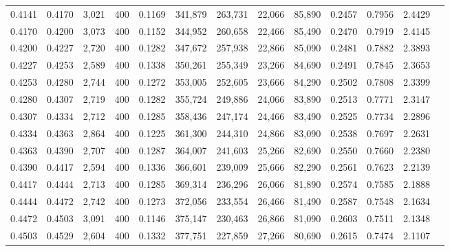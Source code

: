 \begin{tabular}{rrrrrrrrrrrrr}
0.4141 & 0.4170 &  3,021 & 400 &                                     0.1169 & 341,879 & 263,731 &  22,066 &  85,890 & 0.2457 & 0.7956 & 2.4429 \\
0.4170 & 0.4200 &  3,073 & 400 &                                     0.1152 & 344,952 & 260,658 &  22,466 &  85,490 & 0.2470 & 0.7919 & 2.4145 \\
0.4200 & 0.4227 &  2,720 & 400 &                                     0.1282 & 347,672 & 257,938 &  22,866 &  85,090 & 0.2481 & 0.7882 & 2.3893 \\
0.4227 & 0.4253 &  2,589 & 400 &                                     0.1338 & 350,261 & 255,349 &  23,266 &  84,690 & 0.2491 & 0.7845 & 2.3653 \\
0.4253 & 0.4280 &  2,744 & 400 &                                     0.1272 & 353,005 & 252,605 &  23,666 &  84,290 & 0.2502 & 0.7808 & 2.3399 \\
0.4280 & 0.4307 &  2,719 & 400 &                                     0.1282 & 355,724 & 249,886 &  24,066 &  83,890 & 0.2513 & 0.7771 & 2.3147 \\
0.4307 & 0.4334 &  2,712 & 400 &                                     0.1285 & 358,436 & 247,174 &  24,466 &  83,490 & 0.2525 & 0.7734 & 2.2896 \\
0.4334 & 0.4363 &  2,864 & 400 &                                     0.1225 & 361,300 & 244,310 &  24,866 &  83,090 & 0.2538 & 0.7697 & 2.2631 \\
0.4363 & 0.4390 &  2,707 & 400 &                                     0.1287 & 364,007 & 241,603 &  25,266 &  82,690 & 0.2550 & 0.7660 & 2.2380 \\
0.4390 & 0.4417 &  2,594 & 400 &                                     0.1336 & 366,601 & 239,009 &  25,666 &  82,290 & 0.2561 & 0.7623 & 2.2139 \\
0.4417 & 0.4444 &  2,713 & 400 &                                     0.1285 & 369,314 & 236,296 &  26,066 &  81,890 & 0.2574 & 0.7585 & 2.1888 \\
0.4444 & 0.4472 &  2,742 & 400 &                                     0.1273 & 372,056 & 233,554 &  26,466 &  81,490 & 0.2587 & 0.7548 & 2.1634 \\
0.4472 & 0.4503 &  3,091 & 400 &                                     0.1146 & 375,147 & 230,463 &  26,866 &  81,090 & 0.2603 & 0.7511 & 2.1348 \\
0.4503 & 0.4529 &  2,604 & 400 &                                     0.1332 & 377,751 & 227,859 &  27,266 &  80,690 & 0.2615 & 0.7474 & 2.1107 \\

\end{tabular}
